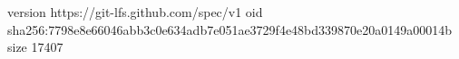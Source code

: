 version https://git-lfs.github.com/spec/v1
oid sha256:7798e8e66046abb3c0e634adb7e051ae3729f4e48bd339870e20a0149a00014b
size 17407

